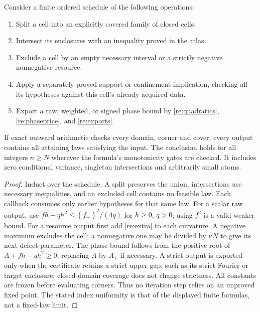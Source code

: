 \begin{theorem}\label{re:enclosure}
Consider a finite ordered schedule of the following operations:
\begin{enumerate}
\item Split a cell into an explicitly covered family of closed cells.
\item Intersect its enclosures with an inequality proved in the atlas.
\item Exclude a cell by an empty necessary interval or a strictly
negative nonnegative resource.
\item Apply a separately proved support or confinement implication,
checking all its hypotheses against this cell's already acquired data.
\item Export a raw, weighted, or signed phase bound by
\eqref{re:quadratics}, \eqref{re:phaseprice}, and \eqref{re:exports}.
\end{enumerate}
If exact outward arithmetic checks every domain, corner and cover,
every output contains all attaining laws satisfying the input. The
conclusion holds for all integers $n\ge N$ wherever the formula's
monotonicity gates are checked. It includes zero conditional variance,
singleton intersections and arbitrarily small atoms.
\end{theorem}
\begin{proof}
Induct over the schedule. A split preserves the union, intersections use
necessary inequalities, and an excluded cell contains no feasible law.
Each callback consumes only earlier hypotheses for that same law.
For a scalar raw output, use
$fh-qh^2\le(f_+)^2/(4q)$ for $h\ge0$, $q>0$; using $f^2$ is a valid
weaker bound. For a resource output first add \eqref{re:extra} to each
curvature. A negative maximum excludes the cell; a nonnegative one may
be divided by $\kappa N$ to give its next defect parameter.
The phase bound follows from the positive root of
$A+fh-qh^2\ge0$, replacing $A$ by $A_+$ if necessary.
A strict output is exported only when the certificate retains a strict
upper gap, such as its strict Fourier or target enclosure; closed-domain
coverage does not change strictness. All constants are frozen before evaluating
corners. Thus no iteration
step relies on an unproved fixed point. The stated index uniformity is
that of the displayed finite formulas, not a fixed-law limit.
\end{proof}

